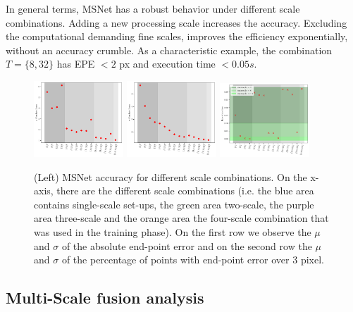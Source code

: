 \documentclass[runningheads]{llncs}
\begin{document}
In general terms, MSNet has a robust behavior under different scale combinations. Adding a new processing scale increases the accuracy. Excluding the computational demanding fine scales, improves the efficiency exponentially, without an accuracy crumble. As a characteristic example, the combination $T = \{8, 32\}$ has EPE $<2$ px and execution time $<0.05s$. 

\begin{figure}[htb!]
    \centering
    \includegraphics[width=0.3\textwidth]{figures/msnet_scales_evaluation1.pdf}
    \includegraphics[width=0.3\textwidth]{figures/msnet_scales_evaluation2.pdf}
    \includegraphics[width=0.3\textwidth]{paper/latex/figures/msnet_inference_times.pdf}
    \caption{(Left) MSNet accuracy for different scale combinations. On the x-axis, there are the different scale combinations (i.e. the blue area contains single-scale set-ups, the green area two-scale, the purple area three-scale and the orange area the four-scale combination that was used in the training phase). On the first row we observe the $\mu$ and $\sigma$ of the absolute end-point error and on the second row the $\mu$ and $\sigma$ of the percentage of points with end-point error over 3 pixel.}
    \label{fig:msnet_scales_evaluation}

\end{figure}

\subsection{Multi-Scale fusion analysis} \label{sec:4_1}
\end{document}
